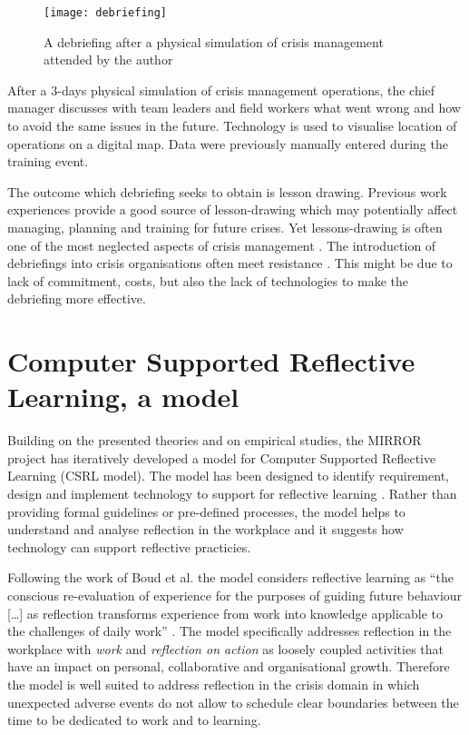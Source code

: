 \begin{figure}[tbh]
    \centering
    \texttt{[image: debriefing]}
    \caption{A debriefing after a physical simulation of crisis management attended by the author}
    \label{fig:debriefing-example}
\end{figure}

After a 3-days physical simulation of crisis management operations, the
chief manager discusses with team leaders and field workers what went
wrong and how to avoid the same issues in the future. Technology is used
to visualise location of operations on a digital map. Data were
previously manually entered during the training event.

The outcome which debriefing seeks to obtain is lesson drawing. Previous
work experiences provide a good source of lesson-drawing which may
potentially affect managing, planning and training for future crises.
Yet lessons-drawing is often one of the most neglected aspects of crisis
management \autocites{Lagadec:1997js}{Stern:1997eb}. The introduction of
debriefings into crisis organisations often meet resistance
\autocite{Lagadec:1997js}. This might be due to lack of commitment,
costs, but also the lack of technologies to make the debriefing more
effective.

\section{Computer Supported Reflective Learning, a
model}\label{computer-supported-reflective-learning-a-model}

Building on the presented theories and on empirical studies, the MIRROR
project has iteratively developed a model for Computer Supported
Reflective Learning (CSRL model). The model has been designed to
identify requirement, design and implement technology to support for
reflective learning \autocite{Krogstie:2013kf}. Rather than providing
formal guidelines or pre-defined processes, the model helps to
understand and analyse reflection in the workplace and it suggests how
technology can support reflective practicies.

Following the work of Boud et al. \autocite*{boud1985reflection} the
model considers reflective learning as ``the conscious re-evaluation of
experience for the purposes of guiding future behaviour {[}\ldots{}{]}
as reflection transforms experience from work into knowledge applicable
to the challenges of daily work'' \autocite{Krogstie:fo}. The model
specifically addresses reflection in the workplace with \emph{work} and
\emph{reflection on action} as loosely coupled activities that have an
impact on personal, collaborative and organisational growth. Therefore
the model is well suited to address reflection in the crisis domain in
which unexpected adverse events do not allow to schedule clear
boundaries between the time to be dedicated to work and to learning.

